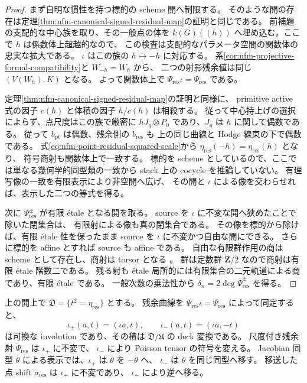 \begin{proof}
まず自明な慣性を持つ標的の scheme 開へ制限する。
そのような開の存在は定理\ref{thm:nfm-canonical-signed-residual-map}の証明と同じである。
前補題の支配的な中心族を取り、その一般点の体を
$k(G)((h))$ へ埋め込む。ここで $h$ は係数体上超越的なので、
この検査は支配的なパラメータ空間の関数体の忠実な拡大である。
$\iota$ はこの族の $h\mapsto-h$ に対応する。
系\ref{cor:nfm-projective-formal-compatibility}と $W_{-h}=W_h$ から、
二つの射影残余値は同じ $(V(W_h),K)$ となる。
よって関数体上で $\Psi_{\mathrm{res}}\iota=\Psi_{\mathrm{res}}$ である。

定理\ref{thm:nfm-canonical-signed-residual-map}の証明と同様に、
primitive active 式の因子 $c(h)$ と体積の因子 $h/c(h)$ は相殺する。
従って中心持上げの選択によらず、点尺度はこの族で厳密に
$hJ_g\otimes P_0$ であり、$J_g$ は $h$ に関して偶数である。
従って $b_{\mathrm{pt}}$ は偶数、残余側の $b_{\mathrm{res}}$ も
上の同じ曲線と Hodge 線束の下で偶数である。
式\eqref{eq:nfm-point-residual-squared-scale}から
$\eta_{\mathrm{res}}(-h)=\eta_{\mathrm{res}}(h)$ となり、
符号商射も関数体上で一致する。
標的を scheme としているので、ここでは単なる幾何学的同型類の一致から
stack 上の cocycle を推論していない。
有理写像の一致を有限表示により非空開へ広げ、
その開と $\iota$ による像を交わらせれば、表示した二つの等式を得る。

次に $\Psi_{\mathrm{res}}^\pm$ が有限 \'etale となる開を取る。
source を $\iota$ に不変な開へ狭めたことで除いた閉集合は、
有限射による像も真の閉集合である。
その像を標的から除けば、有限 \'etale 性を保ったまま source を
$\iota$ に不変かつ自由な開にできる。
さらに標的を affine とすれば source も affine である。
自由な有限群作用の商は scheme として存在し、商射は torsor となる
\cite[Lemma~66.14.2, Tag~07S5]{NFMStacksFreeQuotient}。
群は定数群 $\mathbf Z/2$ なので商射は有限 \'etale 階数二である。
残る射も \'etale 局所的には有限集合の二元軌道による商であり、有限 \'etale である。
一般次数の乗法性から $\delta_n=2\deg\overline\Psi_{\mathrm{res}}^\pm$ を得る。
\end{proof}

\begin{corollary}[尺度二重被覆上の二つの反対作用]
\label{cor:nfm-opposite-scale-cover-actions}
上の開上で $\mathfrak D=\{t^2=\eta_{\mathrm{res}}\}$ とする。
残余曲線を $\Psi_{\mathrm{res}}\iota=\Psi_{\mathrm{res}}$ によって同定すると、
\[
 \iota_+(a,t)=(\iota a,t),\qquad
 \iota_-(a,t)=(\iota a,-t)
\]
は可換な involution であり、その積は $\mathfrak D/\mathfrak U$ の deck 変換である。
尺度付き残余射 $\widetilde\Psi_{\mathrm{res}}$ は $\iota_+$ に不変で、
$\iota_-$ により Poisson tensor の符号を変える。
Jacobian 同型 $\theta$ による表示では、$\iota_+$ は $\theta$ を $-\theta$ へ、
$\iota_-$ は $\theta$ を同じ同型へ移す。
移送した点 shift $\sigma_{\mathrm{res}}$ は $\iota_+$ に不変であり、
$\iota_-$ により逆へ移る。
\end{corollary}

